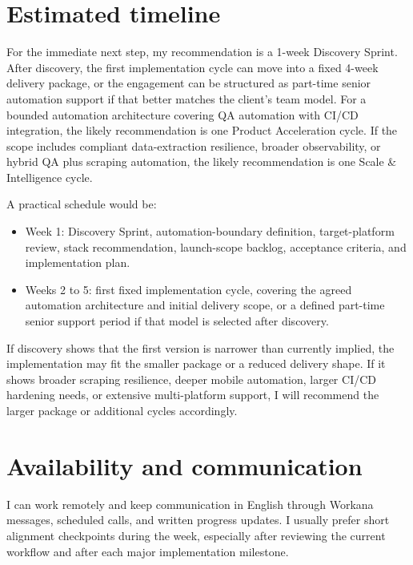 \documentclass[11pt,a4paper]{article}
\begin{document}
\section*{Estimated timeline}

For the immediate next step, my recommendation is a 1-week Discovery Sprint. After discovery, the first implementation cycle can move into a fixed 4-week delivery package, or the engagement can be structured as part-time senior automation support if that better matches the client's team model. For a bounded automation architecture covering QA automation with CI/CD integration, the likely recommendation is one Product Acceleration cycle. If the scope includes compliant data-extraction resilience, broader observability, or hybrid QA plus scraping automation, the likely recommendation is one Scale \& Intelligence cycle.\par

A practical schedule would be:\par

\begin{itemize}
\item Week 1: Discovery Sprint, automation-boundary definition, target-platform review, stack recommendation, launch-scope backlog, acceptance criteria, and implementation plan.
\item Weeks 2 to 5: first fixed implementation cycle, covering the agreed automation architecture and initial delivery scope, or a defined part-time senior support period if that model is selected after discovery.
\end{itemize}

If discovery shows that the first version is narrower than currently implied, the implementation may fit the smaller package or a reduced delivery shape. If it shows broader scraping resilience, deeper mobile automation, larger CI/CD hardening needs, or extensive multi-platform support, I will recommend the larger package or additional cycles accordingly.\par

\section*{Availability and communication}

I can work remotely and keep communication in English through Workana messages, scheduled calls, and written progress updates. I usually prefer short alignment checkpoints during the week, especially after reviewing the current workflow and after each major implementation milestone.\par
\end{document}
